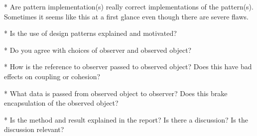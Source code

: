 \documentclass[a4paper]{scrreprt}
\begin{document}
* Are pattern implementation(s) really correct implementations of the pattern(s).
Sometimes it seems like this at a first glance even though there are severe flaws.

* Is the use of design patterns explained and motivated?

* Do you agree with choices of observer and observed object?

* How is the reference to observer passed to observed object? Does this have bad
effects on coupling or cohesion?

* What data is passed from observed object to observer? Does this brake encapsulation of the observed object?

* Is the method and result explained in the report? Is there a discussion? Is the
discussion relevant?


\listoflistings %
\printbibliography
\end{document}
